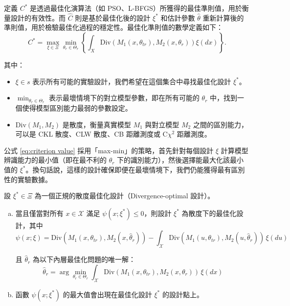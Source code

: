 \hspace*{8mm} 定義 $C^*$ 是透過最佳化演算法（如 PSO、L-BFGS）所獲得的最佳準則值，用於衡量設計的有效性。而 $\hat{C}$ 則是基於最佳化後的設計 $\xi^*$ 和估計參數 $\hat{\theta}$ 重新計算後的準則值，用於檢驗最佳化過程的穩定性。最佳化準則值的數學定義如下：
\begin{equation}\label{eq:criterion value}
C^* = \max_{\xi \in \Xi} \min_{\theta_r \in \Theta_r} \left\{ \int_X \text{Div} \left( M_1(x, \theta_{tr}), M_2(x, \theta_r) \right) \xi(dx) \right\}.
\end{equation}

其中：
\begin{itemize}
\item $\xi \in s$ 表示所有可能的實驗設計，我們希望在這個集合中尋找最佳化設計 $\xi^*$。
\item $\min_{\theta_r \in \Theta_r}$ 表示最壞情境下的對立模型參數，即在所有可能的 $\theta_r$ 中，找到一個使得模型區別能力最弱的參數設定。
\item $\text{Div}(M_1, M_2)$ 是散度，衡量真實模型 $M_1$ 與對立模型 $M_2$ 之間的區別能力，可以是 CKL 散度、CLW 散度、CB 距離測度或 C$\chi^2$ 距離測度。
\end{itemize}

\hspace*{8mm} 公式 \eqref{eq:criterion value} 採用「max-min」的策略，首先針對每個設計 $\xi$ 計算模型辨識能力的最小值（即在最不利的 $\theta_r$ 下的識別能力），然後選擇能最大化該最小值的 $\xi^*$。換句話說，這樣的設計確保即便在最壞情境下，我們仍能獲得最有區別性的實驗數據。

\begin{conjecture}
設 $\xi^* \in \Xi$ 為一個正規的散度最佳化設計（Divergence-optimal 設計）。

\begin{enumerate}[(a)]
\item 當且僅當對所有 $x \in \mathcal{X}$ 滿足 $\psi(x; \xi^*) \leq 0$，則設計 $\xi^*$ 為散度下的最佳化設計，其中
\begin{equation}
\psi(x; \xi) = \mathrm{Div}(M_1(x, \theta_{tr}), M_2(x, \hat{\theta}_r)) - \int_{\mathcal{X}} \mathrm{Div}(M_1(u, \theta_{tr}), M_2(u, \hat{\theta}_r)) \, \xi(du)
\end{equation}

且 $\hat{\theta}_r$ 為以下內層最佳化問題的唯一解：
\begin{equation}
\hat{\theta}_r = \arg\min_{\theta_r \in \Theta_r} \int_{\mathcal{X}} \mathrm{Div}(M_1(x, \theta_{tr}), M_2(x, \theta_r)) \, \xi(dx)
\end{equation}

\item 函數 $\psi(x; \xi^*)$ 的最大值會出現在最佳化設計 $\xi^*$ 的設計點上。
\end{enumerate}
\end{conjecture}

